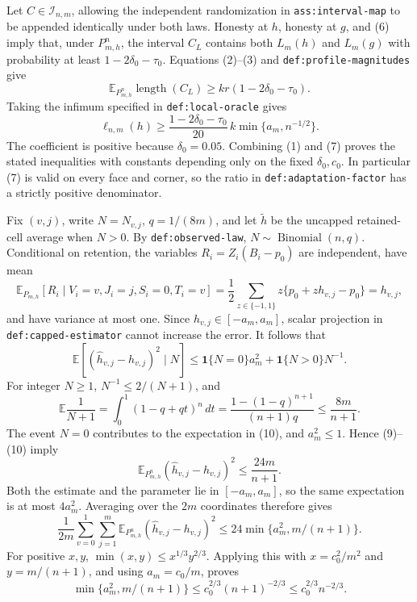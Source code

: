 Let \(C\in\mathcal I_{n,m}\), allowing the independent randomization in
\texttt{ass:interval-map} to be appended identically under both laws.
Honesty at \(h\), honesty at \(g\), and (6) imply that, under
\(P_{m,h}^n\), the interval \(C_L\) contains both \(L_m(h)\) and
\(L_m(g)\) with probability at least
\(1-2\delta_0-\tau_0\).  Equations (2)--(3) and
\texttt{def:profile-magnitudes} give
\[
 \mathbb E_{P_{m,h}^n}\operatorname{length}(C_L)
 \ge kr(1-2\delta_0-\tau_0).
\]
Taking the infimum specified in \texttt{def:local-oracle} gives
\[
 \ell_{n,m}(h)\ge
 \frac{1-2\delta_0-\tau_0}{20}\,k\min\{a_m,n^{-1/2}\}.                \tag{7}
\]
The coefficient is positive because \(\delta_0=0.05\).  Combining (1) and
(7) proves the stated inequalities with constants depending only on the
fixed \(\delta_0,c_0\).  In particular (7) is valid on every face and corner,
so the ratio in \texttt{def:adaptation-factor} has a strictly positive
denominator.

Fix \((v,j)\), write \(N=N_{v,j}\), \(q=1/(8m)\), and let
\(\widetilde h\) be the uncapped retained-cell average when \(N>0\).
By \texttt{def:observed-law}, \(N\sim\operatorname{Binomial}(n,q)\).
Conditional on retention, the variables \(R_i=Z_i(B_i-p_0)\) are independent,
have mean
\[
 \mathbb E_{P_{m,h}}[R_i\mid V_i=v,J_i=j,S_i=0,T_i=v]
 =\frac12\sum_{z\in\{-1,1\}}z\{p_0+zh_{v,j}-p_0\}=h_{v,j},             \tag{8}
\]
and have variance at most one.  Since \(h_{v,j}\in[-a_m,a_m]\), scalar
projection in \texttt{def:capped-estimator} cannot increase the error.
It follows that
\[
 \mathbb E[(\widehat h_{v,j}-h_{v,j})^2\mid N]
 \le \mathbf1\{N=0\}a_m^2+\mathbf1\{N>0\}N^{-1}.                      \tag{9}
\]
For integer \(N\ge1\), \(N^{-1}\le2/(N+1)\), and
\[
 \mathbb E\frac1{N+1}
 =\int_0^1(1-q+qt)^n\,dt
 =\frac{1-(1-q)^{n+1}}{(n+1)q}
 \le\frac{8m}{n+1}.                                                     \tag{10}
\]
The event \(N=0\) contributes to the expectation in (10), and
\(a_m^2\le1\).  Hence (9)--(10) imply
\[
 \mathbb E_{P_{m,h}^n}(\widehat h_{v,j}-h_{v,j})^2
 \le\frac{24m}{n+1}.                                                     \tag{11}
\]
Both the estimate and the parameter lie in \([-a_m,a_m]\), so the same
expectation is at most \(4a_m^2\).  Averaging over the \(2m\) coordinates
therefore gives
\[
 \frac1{2m}\sum_{v=0}^1\sum_{j=1}^m
 \mathbb E_{P_{m,h}^n}(\widehat h_{v,j}-h_{v,j})^2
 \le24\min\{a_m^2,m/(n+1)\}.                                          \tag{12}
\]
For positive \(x,y\), \(\min(x,y)\le x^{1/3}y^{2/3}\).  Applying this
with \(x=c_0^2/m^2\) and \(y=m/(n+1)\), and using \(a_m=c_0/m\), proves
\[
 \min\{a_m^2,m/(n+1)\}
 \le c_0^{2/3}(n+1)^{-2/3}\le c_0^{2/3}n^{-2/3}.                        \tag{13}
\]

